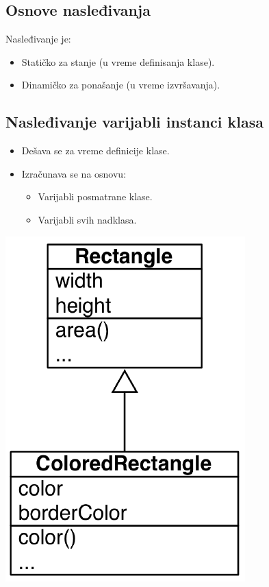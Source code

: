 \documentclass[presentation]{beamer}
\begin{document}
\subsection{Osnove nasleđivanja}
\label{sec:org40987c8}

Nasleđivanje je:
\begin{itemize}
\item Statičko za stanje (u vreme definisanja klase).
\item Dinamičko za ponašanje (u vreme izvršavanja).
\end{itemize}

\subsection{Nasleđivanje varijabli instanci klasa}
\label{sec:org251c0cf}

\begin{itemize}
\item Dešava se za vreme definicije klase.
\item Izračunava se na osnovu:
\begin{itemize}
\item Varijabli posmatrane klase.
\item Varijabli svih nadklasa.
\end{itemize}
\end{itemize}
\begin{center}
\includegraphics[width=.9\linewidth]{./slike/inheritance.png}
\end{center}
\end{document}
